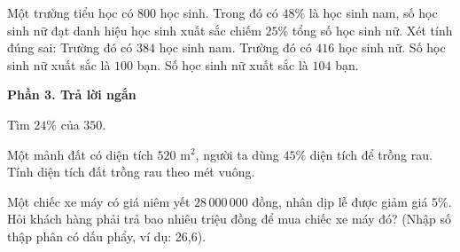 \begin{ex} %
Một trường tiểu học có $800$ học sinh. Trong đó có $48\%$ là học sinh nam, số học sinh nữ đạt danh hiệu học sinh xuất sắc chiếm $25\%$ tổng số học sinh nữ. Xét tính đúng sai:
\choiceTF
{\True Trường đó có $384$ học sinh nam.}
{\True Trường đó có $416$ học sinh nữ.}
{Số học sinh nữ xuất sắc là $100$ bạn.}
{\True Số học sinh nữ xuất sắc là $104$ bạn.}
\end{ex}

\textbf{Phần 3. Trả lời ngắn}

\begin{ex} %
Tìm $24\%$ của $350$.
\end{ex}

\begin{ex} %
Một mảnh đất có diện tích $520\text{ m}^2$, người ta dùng $45\%$ diện tích để trồng rau. Tính diện tích đất trồng rau theo mét vuông.
\end{ex}

\begin{ex} %
Một chiếc xe máy có giá niêm yết $28\,000\,000$ đồng, nhân dịp lễ được giảm giá $5\%$. Hỏi khách hàng phải trả bao nhiêu triệu đồng để mua chiếc xe máy đó? (Nhập số thập phân có dấu phẩy, ví dụ: 26,6).
\end{ex}

